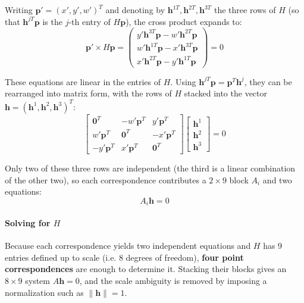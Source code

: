 Writing $\boldsymbol{p}' = (x', y', w')^T$ and denoting by $\boldsymbol{h}^{1T}, \boldsymbol{h}^{2T}, \boldsymbol{h}^{3T}$ the three rows of $H$ (so that $\boldsymbol{h}^{jT}\boldsymbol{p}$ is the $j$-th entry of $H\boldsymbol{p}$), the cross product expands to:
\[ \boldsymbol{p}' \times H\boldsymbol{p} = \begin{pmatrix}
y' \boldsymbol{h}^{3T}\boldsymbol{p} - w' \boldsymbol{h}^{2T}\boldsymbol{p} \\
w' \boldsymbol{h}^{1T}\boldsymbol{p} - x' \boldsymbol{h}^{3T}\boldsymbol{p} \\
x' \boldsymbol{h}^{2T}\boldsymbol{p} - y' \boldsymbol{h}^{1T}\boldsymbol{p}
\end{pmatrix} = 0 \]

These equations are linear in the entries of $H$. Using $\boldsymbol{h}^{jT}\boldsymbol{p} = \boldsymbol{p}^T\boldsymbol{h}^{j}$, they can be rearranged into matrix form, with the rows of $H$ stacked into the vector $\boldsymbol{h} = (\boldsymbol{h}^{1}, \boldsymbol{h}^{2}, \boldsymbol{h}^{3})^T$:
\[ \begin{bmatrix}
\boldsymbol{0}^T & -w' \boldsymbol{p}^T & y' \boldsymbol{p}^T \\
w' \boldsymbol{p}^T & \boldsymbol{0}^T & -x' \boldsymbol{p}^T \\
-y' \boldsymbol{p}^T & x' \boldsymbol{p}^T & \boldsymbol{0}^T
\end{bmatrix} \begin{bmatrix} \boldsymbol{h}^{1} \\ \boldsymbol{h}^{2} \\ \boldsymbol{h}^{3} \end{bmatrix} = 0 \]

Only two of these three rows are independent (the third is a linear combination of the other two), so each correspondence contributes a $2 \times 9$ block $A_i$ and two equations:
\[ A_i \boldsymbol{h} = 0 \]

\paragraph{Solving for $H$}
Because each correspondence yields two independent equations and $H$ has $9$ entries defined up to scale (i.e. $8$ degrees of freedom), \textbf{four point correspondences} are enough to determine it.
Stacking their blocks gives an $8 \times 9$ system $A\boldsymbol{h} = 0$, and the scale ambiguity is removed by imposing a normalization such as $\lVert \boldsymbol{h} \rVert = 1$.

